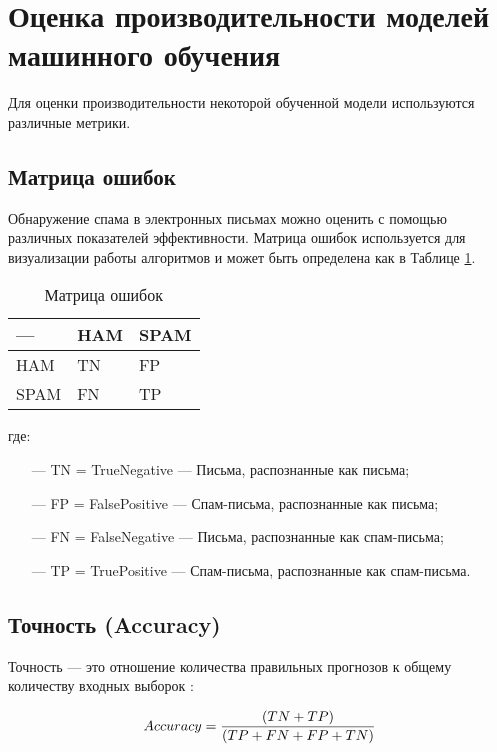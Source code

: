 \section{Оценка производительности моделей машинного обучения}\label{Section:Performance}

Для оценки производительности некоторой обученной модели используются различные метрики.

\subsection{Матрица ошибок}

Обнаружение спама в электронных письмах можно оценить с помощью
различных показателей эффективности. Матрица ошибок используется для
визуализации работы алгоритмов и может быть определена как в Таблице \ref{table1}.

\begin{table}[!ht]
    \centering
    \caption{Матрица ошибок}
    \begin{tabular}{|p{}|p{}|p{}|}
    \hline
        — & HAM & SPAM \\ \hline
        HAM & TN & FP \\ \hline
        SPAM & FN & TP \\ \hline
    \end{tabular}
    \label{table1}
\end{table}
где:

\begin{itemize}
    \item[—] TN = TrueNegative — Письма, распознанные как письма;
    \item[—] FP = FalsePositive — Спам-письма, распознанные как письма;
    \item[—] FN = FalseNegative — Письма, распознанные как спам-письма;
    \item[—] TP = TruePositive — Спам-письма, распознанные как спам-письма.
\end{itemize}


\subsection{Точность (Accuracy)}

Точность — это отношение количества правильных прогнозов к общему количеству входных
выборок \cite{scikitMetrics}:

\begin{equation}\label{eq11}
    Accuracy = {{(TN + TP)} \over{(TP + FN + FP + TN)}}
\end{equation}

